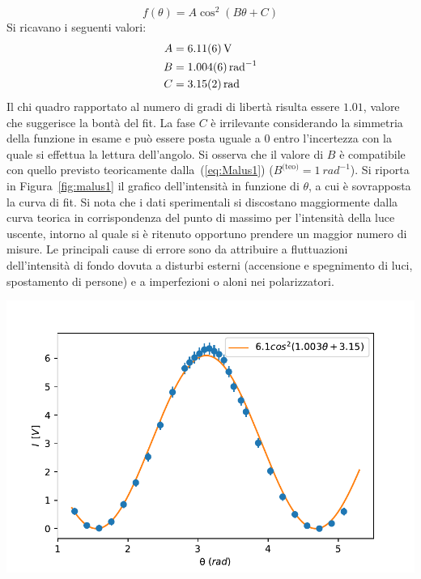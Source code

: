 \documentclass[10pt,oneside,a4paper]{article}
\newenvironment{Figure}
  {\par\medskip\noindent\minipage{\linewidth}}
  {\endminipage\par\medskip}
\begin{document}
\begin{multicols}{2}
\[
f(\theta) = A\cos^2(B\theta + C)
\]
Si ricavano i seguenti valori:
\[
\begin{aligned}
A &= \SI{6.11 \pm 0.06}{V} \\
B &= \SI{1.004 \pm 0.006}{rad^{-1}} \\
C &= \SI{3.15 \pm 0.02}{rad}
\end{aligned}
\]
Il chi quadro rapportato al numero di gradi di libertà risulta essere $1.01$, valore che suggerisce la bontà del fit. La fase $C$ è irrilevante considerando la simmetria della funzione in esame e può essere posta uguale a $0$ entro l'incertezza con la quale si effettua la lettura dell'angolo. Si osserva che il valore di $B$ è compatibile con quello previsto teoricamente dalla~(\ref{eq:Malus1}) ($B^{\text{(teo)}} = \SI{1}{rad^{-1}}$).
Si riporta in Figura~\ref{fig:malus1} il grafico dell'intensità in funzione di $\theta$, a cui è sovrapposta la curva di fit. Si nota che i dati sperimentali si discostano maggiormente dalla curva teorica in corrispondenza del punto di massimo per l'intensità della luce uscente, intorno al quale si è ritenuto opportuno prendere un maggior numero di misure.
Le principali cause di errore sono da attribuire a fluttuazioni dell'intensità di fondo dovuta a disturbi esterni (accensione e spegnimento di luci, spostamento di persone) e a imperfezioni o aloni nei polarizzatori.


\begin{Figure}
	\begin{center}
	\includegraphics[width=\linewidth]{malus1.pdf}
	\label{fig:malus1}
	\end{center}
\end{Figure}


\end{multicols}
\end{document}
